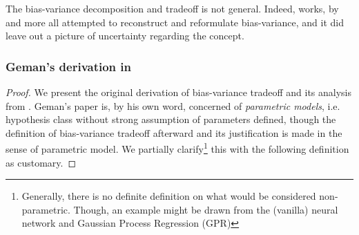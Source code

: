 The bias-variance decomposition and tradeoff is not general. Indeed, works, by \cite{6797087,sharma_bias-variance_2014,domingos_unifeid_2000,adlam2020understandingdoubledescentrequires,yang_rethinking_2020} and more all attempted to reconstruct and reformulate bias-variance, and it did leave out a picture of uncertainty regarding the concept. 

\subsubsection{Geman's derivation in \cite{6797087}}

\begin{proof}
    We present the original derivation of bias-variance tradeoff and its analysis from \cite{6797087}. Geman's paper is, by his own word, concerned of \textit{parametric models}, i.e. hypothesis class without strong assumption of parameters defined, though the definition of bias-variance tradeoff afterward and its justification is made in the sense of parametric model. We partially clarify\footnote{Generally, there is no definite definition on what would be considered non-parametric. Though, an example might be drawn from the (vanilla) neural network and Gaussian Process Regression (GPR)} this with the following definition as customary. 


\end{proof}
